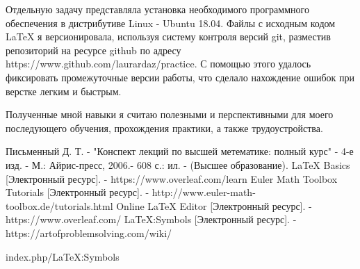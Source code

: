 \documentclass[14pt]{extreport}
\begin{document}
Отдельную задачу представляла установка необходимого программного обеспечения в дистрибутиве Linux - Ubuntu 18.04. Файлы с исходным кодом LaTeX я версионировала, используя систему контроля версий git, разместив репозиторий на ресурсе github по адресу https://www.github.com/laurardaz/practice. С помощью этого удалось фиксировать промежуточные версии работы, что сделало нахождение ошибок при верстке легким и быстрым. 

Полученные мной навыки я считаю полезными и перспективными для моего последующего обучения, прохождения практики, а также трудоустройства.  

\newpage
 

 
\begin{thebibliography}{}
      Письменный Д. Т.  -  "Конспект лекций по высшей метематике: полный курс" - 4-е изд. - М.: Айрис-пресс, 2006.- 608 с.: ил. - (Высшее образование).
      LaTeX Basics [Электронный ресурс]. - https://www.overleaf.com/learn
     Euler Math Toolbox Tutorials [Электронный ресурс]. -  http://www.euler-math-toolbox.de/tutorials.html
    Online LaTeX Editor [Электронный ресурс]. - https://www.overleaf.com/
    LaTeX:Symbols [Электронный ресурс]. - https://artofproblemsolving.com/wiki/

index.php/LaTeX:Symbols

\end{thebibliography}
\end{document}

